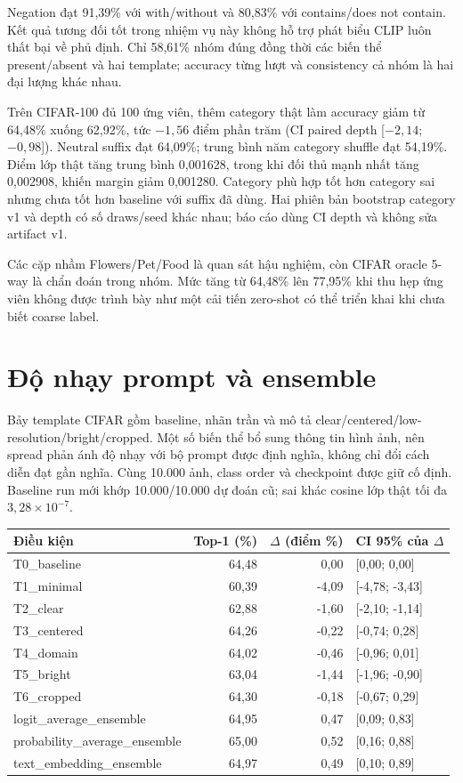 \documentclass[11pt,a4paper]{article}
\begin{document}
Negation đạt 91,39\% với with/without và 80,83\% với contains/does not contain. Kết quả tương đối tốt trong nhiệm vụ này không hỗ trợ phát biểu CLIP luôn thất bại về phủ định. Chỉ 58,61\% nhóm đúng đồng thời các biến thể present/absent và hai template; accuracy từng lượt và consistency cả nhóm là hai đại lượng khác nhau.

Trên CIFAR-100 đủ 100 ứng viên, thêm category thật làm accuracy giảm từ 64,48\% xuống 62,92\%, tức $-1,56$ điểm phần trăm (CI paired depth [$-2,14$; $-0,98$]). Neutral suffix đạt 64,09\%; trung bình năm category shuffle đạt 54,19\%. Điểm lớp thật tăng trung bình 0,001628, trong khi đối thủ mạnh nhất tăng 0,002908, khiến margin giảm 0,001280. Category phù hợp tốt hơn category sai nhưng chưa tốt hơn baseline với suffix đã dùng. Hai phiên bản bootstrap category v1 và depth có số draws/seed khác nhau; báo cáo dùng CI depth và không sửa artifact v1.

Các cặp nhầm Flowers/Pet/Food là quan sát hậu nghiệm, còn CIFAR oracle 5-way là chẩn đoán trong nhóm. Mức tăng từ 64,48\% lên 77,95\% khi thu hẹp ứng viên không được trình bày như một cải tiến zero-shot có thể triển khai khi chưa biết coarse label.

\newpage
\section{Độ nhạy prompt và ensemble}
Bảy template CIFAR gồm baseline, nhãn trần và mô tả clear/centered/low-resolution/bright/cropped. Một số biến thể bổ sung thông tin hình ảnh, nên spread phản ánh độ nhạy với bộ prompt được định nghĩa, không chỉ đổi cách diễn đạt gần nghĩa. Cùng 10.000 ảnh, class order và checkpoint được giữ cố định. Baseline run mới khớp 10.000/10.000 dự đoán cũ; sai khác cosine lớp thật tối đa $3,28\times10^{-7}$.

\begin{center}\small
{}
\begin{tabular}{@{}lrrl@{}}\toprule
Điều kiện & Top-1 (\%) & $\Delta$ (điểm \%) & CI 95\% của $\Delta$\\\midrule
T0\_baseline & 64,48 & 0,00 & [0,00; 0,00]\\
T1\_minimal & 60,39 & -4,09 & [-4,78; -3,43]\\
T2\_clear & 62,88 & -1,60 & [-2,10; -1,14]\\
T3\_centered & 64,26 & -0,22 & [-0,74; 0,28]\\
T4\_domain & 64,02 & -0,46 & [-0,96; 0,01]\\
T5\_bright & 63,04 & -1,44 & [-1,96; -0,90]\\
T6\_cropped & 64,30 & -0,18 & [-0,67; 0,29]\\
logit\_average\_ensemble & 64,95 & 0,47 & [0,09; 0,83]\\
probability\_average\_ensemble & 65,00 & 0,52 & [0,16; 0,88]\\
text\_embedding\_ensemble & 64,97 & 0,49 & [0,10; 0,89]\\
\bottomrule\end{tabular}\end{center}
\end{document}
